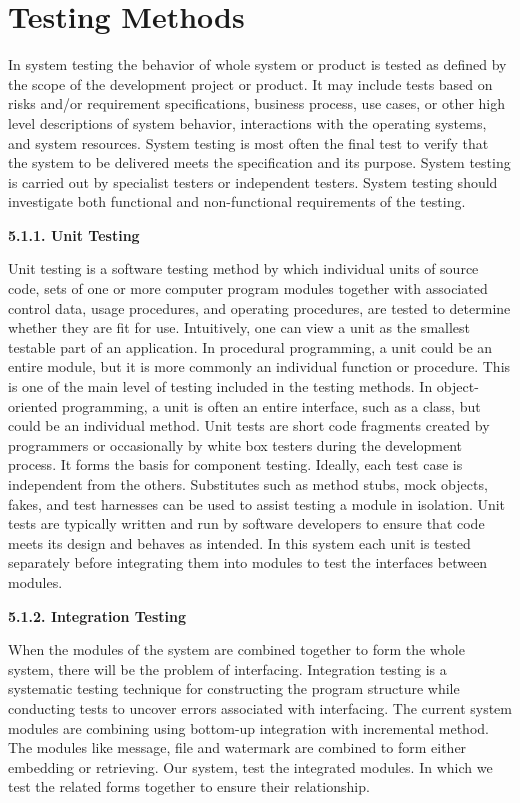 %
\section{Testing Methods}

In system testing the behavior of whole system or product is tested as defined by the scope of the development project or product. It may include tests based on risks and/or requirement specifications, business process, use cases, or other high level descriptions of system behavior, interactions with the operating systems, and system resources. System testing is most often the final test to verify that the system to be delivered meets the specification and its purpose. System testing is carried out by specialist testers or independent testers. System testing should investigate both functional and non-functional requirements of the testing. 

{\bf5.1.1. Unit Testing}

 Unit testing is a software testing method by which individual units of source code, sets of one or more computer program modules together with associated control data, usage procedures, and operating procedures, are tested to determine whether they are fit for use. Intuitively, one can view a unit as the smallest testable part of an application. In procedural programming, a unit could be an entire module, but it is more commonly an individual function or procedure. This is one of the main level of testing included in the testing methods. In object-oriented programming, a unit is often an entire interface, such as a class, but could be an individual method. Unit tests are short code fragments created by programmers or occasionally by white box testers during the development process. It forms the basis for component testing. Ideally, each test case is independent from the others. Substitutes such as method stubs, mock objects, fakes, and test harnesses can be used to assist testing a module in isolation. Unit tests are typically written and run by software developers to ensure that code meets its design and behaves as intended. In this system each unit is tested separately before integrating them into modules to test the interfaces between modules. 

{\bf5.1.2. Integration Testing }

When the modules of the system are combined together to form the whole system, there will be the problem of interfacing. Integration testing is a systematic testing technique for constructing the program structure while conducting tests to uncover errors associated with interfacing. The current system modules are combining using bottom-up integration with incremental method. The modules like message, file and watermark are combined to form either embedding or retrieving. Our system, test the integrated modules. In which we test the related forms together to ensure their relationship. 

